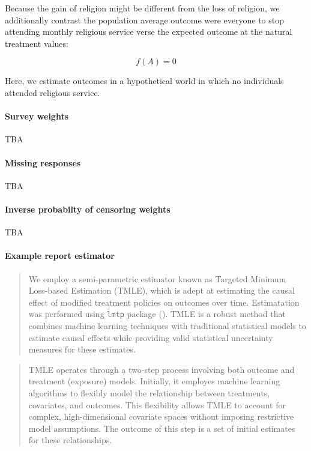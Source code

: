 \documentclass[
  singlecolumn]{article}
\let\oldparagraph\paragraph
\renewcommand{\paragraph}[1]{\oldparagraph{#1}\mbox{}}
\begin{document}
Because the gain of religion might be different from the loss of
religion, we additionally contrast the population average outcome were
everyone to stop attending monthly religious service verse the expected
outcome at the natural treatment values:

\[f(A) = 0 \]

Here, we estimate outcomes in a hypothetical world in which no
individuals attended religious service.

\paragraph{Survey weights}\label{survey-weights}

TBA

\paragraph{Missing responses}\label{missing-responses}

TBA

\paragraph{Inverse probabilty of censoring
weights}\label{inverse-probabilty-of-censoring-weights}

TBA

\paragraph{Example report estimator}\label{example-report-estimator}

\begin{quote}
We employ a semi-parametric estimator known as Targeted Minimum
Loss-based Estimation (TMLE), which is adept at estimating the causal
effect of modified treatment policies on outcomes over time.
Estimatation was performed using \texttt{lmtp} package
(). TMLE is a robust
method that combines machine learning techniques with traditional
statistical models to estimate causal effects while providing valid
statistical uncertainty measures for these estimates.
\end{quote}

\begin{quote}
TMLE operates through a two-step process involving both outcome and
treatment (exposure) models. Initially, it employes machine learning
algorithms to flexibly model the relationship between treatments,
covariates, and outcomes. This flexibility allows TMLE to account for
complex, high-dimensional covariate spaces without imposing restrictive
model assumptions. The outcome of this step is a set of initial
estimates for these relationships.
\end{quote}
\end{document}
